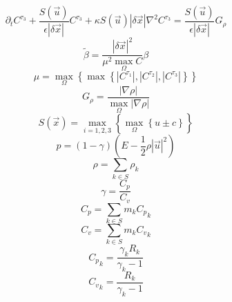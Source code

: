 \documentclass[10pt,letterpaper]{article}
\begin{document}
  \begin{equation}
    \tag{1j}
    \partial_tC^{\tau_3} + \frac{S(\vec{u})}{\epsilon|\delta\vec{x}|}C^{\tau_3} + \kappa S(\vec{u})|\delta\vec{x}|\nabla^2 C^{\tau_3} = \frac{S(\vec{u})}{\epsilon|\delta\vec{x}|}G_\rho
  \end{equation}
  \begin{equation}
    \tag{2a}
    \widetilde{\beta} = \frac{|\delta\vec{x}|^2}{\mu^2\max_\Omega C}{\beta}
  \end{equation}
  \begin{equation}
    \tag{2b}
    \mu = \max_\Omega\left\{\max\left\{|C^{\tau_1}|,|C^{\tau_2}|,|C^{\tau_3}|\right\}\right\}
  \end{equation}
  \begin{equation}
    \tag{2c}
    G_\rho = \frac{|\nabla\rho|}{\max_\Omega|\nabla\rho|}
  \end{equation}
  \begin{equation}
    \tag{2d}
    S(\vec{x}) = \max_{i=1,2,3}\left\{\max_\Omega\left\{u\pm c\right\}\right\}
  \end{equation}
  \begin{equation}
    \tag{2e}
    p = (1-\gamma)\left(E-\frac{1}{2}\rho|\vec{u}|^2\right)
  \end{equation}
  \begin{equation}
    \tag{2f}
    \rho = \sum_{k\in S}\rho_k
  \end{equation}
  \begin{equation}
    \tag{2g}
    \gamma = \frac{C_p}{C_v}
  \end{equation}
  \begin{equation}
    \tag{2h}
    C_p = \sum_{k\in S}m_k{C_p}_k
  \end{equation}
  \begin{equation}
    \tag{2j}
    C_v = \sum_{k\in S}m_k{C_v}_k
  \end{equation}
  \begin{equation}
    \tag{2k}
    {C_p}_k = \frac{\gamma_k R_k}{\gamma_k-1}
  \end{equation}
  \begin{equation}
    \tag{2m}
    {C_v}_k = \frac{R_k}{\gamma_k-1}
  \end{equation}
\end{document}
